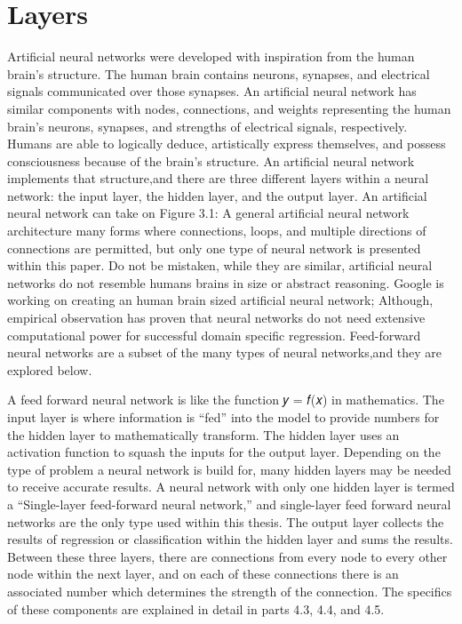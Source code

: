 \documentclass[../main.tex]{subfiles}
\begin{document}
    \section{Layers}\label{sec:layers}
    Artificial neural networks were developed with inspiration from the human brain's structure.
    The human brain contains neurons, synapses, and electrical signals communicated over those synapses.
    An artificial neural network has similar components with nodes, connections, and weights representing the human brain's neurons, synapses, and strengths of electrical signals, respectively.
    Humans are able to logically deduce, artistically express themselves, and possess consciousness because of the brain’s structure.
    An artificial neural network implements that structure,and there are three different layers within a neural network: the input layer, the hidden layer, and the output layer.
    An artificial neural network can take on Figure 3.1: A general artificial neural network architecture many forms where connections, loops, and multiple directions of connections are permitted, but only one type of neural network is presented within this paper.
    Do not be mistaken, while they are similar, artificial neural networks do not resemble humans brains in size or abstract reasoning.
    Google is working on creating an human brain sized artificial neural network; Although, empirical observation has proven that neural networks do not need extensive computational power for successful domain specific regression.
    Feed-forward neural networks are a subset of the many types of neural networks,and they are explored below.

    A feed forward neural network is like the function 𝑦 = 𝑓(𝑥) in mathematics.
    The input layer is where information is “fed” into the model to provide numbers for the hidden layer to mathematically transform.
    The hidden layer uses an activation function to squash the inputs for the output layer.
    Depending on the type of problem a neural network is build for, many hidden layers may be needed to receive accurate results.
    A neural network with only one hidden layer is termed a “Single-layer feed-forward neural network,” and single-layer feed forward neural networks are the only type used within this thesis.
    The output layer collects the results of regression or classification within the hidden layer and sums the results.
    Between these three layers, there are connections from every node to every other node within the next layer, and on each of these connections there is an associated number which determines the strength of the connection.
    The specifics of these components are explained in detail in parts 4.3, 4.4, and 4.5.
\end{document}
